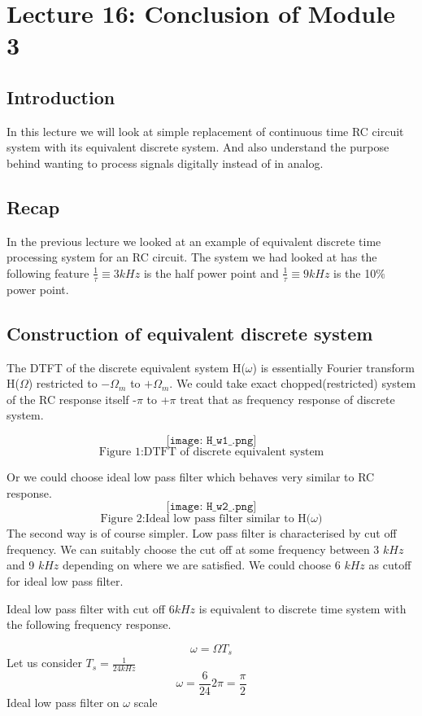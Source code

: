 \section{Lecture 16: Conclusion of Module 3 }


\subsection{Introduction}
In this lecture we will look at simple replacement of continuous time RC circuit system with its equivalent discrete system. And also understand the purpose behind wanting to process signals digitally instead of in analog.
\subsection{Recap}
In the previous lecture we looked at an example of equivalent discrete time processing system for an RC circuit. The system we had looked at has the following feature
$\frac{1}{\tau}\equiv 3 kHz$ is the half power point and $\frac{1}{\tau}\equiv 9 kHz$ is the 10$\%$ power point.

\subsection{Construction of equivalent discrete system}
The DTFT of the discrete equivalent system H($\omega$) is essentially Fourier transform H($\Omega$) restricted to $-\Omega_m$ to $+\Omega_m$. We could take exact chopped(restricted) system of the RC response itself -$\pi$ to +$\pi$ treat that as frequency response of discrete system.


$$\texttt{[image: H\_w1\_.png]}$$
$$\mbox{Figure 1:DTFT of discrete equivalent system}$$




Or we could choose ideal low pass filter which behaves very similar to RC response.
$$\texttt{[image: H\_w2\_.png]}$$
$$\mbox{Figure 2:Ideal low pass filter similar to H($\omega$)}$$
The second way is of course simpler. Low pass filter is characterised by cut off frequency. We can suitably choose the cut off at some frequency between 3 $kHz$ and 9 $kHz$ depending on where we are satisfied. We could choose 6 $kHz$ as cutoff for ideal low pass filter.

Ideal low pass filter with cut off $6 kHz$ is equivalent to discrete time system with the following frequency response.

$$\omega = \Omega T_s $$
Let us consider $T_s=\frac{1}{24 kHz}$
$$\omega = \frac{6}{24}2\pi = \frac{\pi}{2}$$
Ideal low pass filter on $\omega$ scale


